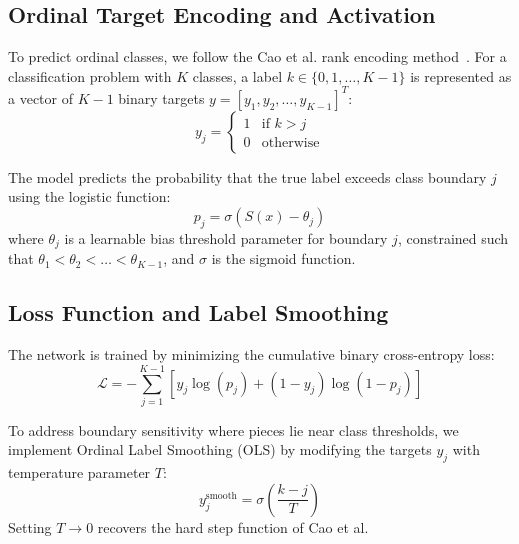 \subsection{Ordinal Target Encoding and Activation}
To predict ordinal classes, we follow the Cao et al. rank encoding method~\cite{cao2020rank}. For a classification problem with $K$ classes, a label $k \in \{0, 1, \dots, K-1\}$ is represented as a vector of $K-1$ binary targets $y = [y_1, y_2, \dots, y_{K-1}]^T$:
\begin{equation}
    y_j = \begin{cases}
        1 & \text{if } k > j \\
        0 & \text{otherwise}
    \end{cases}
\end{equation}

The model predicts the probability that the true label exceeds class boundary $j$ using the logistic function:
\begin{equation}
    p_j = \sigma(S(x) - \theta_j)
\end{equation}
where $\theta_j$ is a learnable bias threshold parameter for boundary $j$, constrained such that $\theta_1 < \theta_2 < \dots < \theta_{K-1}$, and $\sigma$ is the sigmoid function.

\subsection{Loss Function and Label Smoothing}
The network is trained by minimizing the cumulative binary cross-entropy loss:
\begin{equation}
    \mathcal{L} = - \sum_{j=1}^{K-1} [ y_j \log(p_j) + (1 - y_j) \log(1 - p_j) ]
\end{equation}

To address boundary sensitivity where pieces lie near class thresholds, we implement Ordinal Label Smoothing (OLS) by modifying the targets $y_j$ with temperature parameter $T$:
\begin{equation}
    y_j^{\text{smooth}} = \sigma\left( \frac{k - j}{T} \right)
\end{equation}
Setting $T \to 0$ recovers the hard step function of Cao et al.
